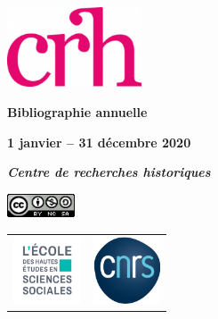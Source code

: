 \begin{titlepage}
\begin{center}

\vspace*{1,75cm}

\includegraphics[width=4cm]{img/logo_crh_magenta.png}
\bigskip
\bigskip
\bigskip
\bigskip

\begin{Huge}
\textbf{Bibliographie annuelle}
\end{Huge}

\bigskip

\begin{LARGE}
\textbf{1 janvier -- 31 décembre 2020}

\bigskip
\bigskip


\textbf{\emph{Centre de recherches historiques} }\\
\end{LARGE}

\bigskip
\bigskip


\vspace*{3cm}

\includegraphics[width=2cm]{img/licenseccby-nc-sa4.0.png}

\vspace*{3,5cm}

\begin{tabular}{cc}
    \includegraphics[width=2cm]{img/Logo_EHESS_2021_RVB.png} & \includegraphics[width=2cm]{img/cnrslogo.png} \\
\end{tabular}

\end{center}
\afterpage{\blankpage}
\end{titlepage}
